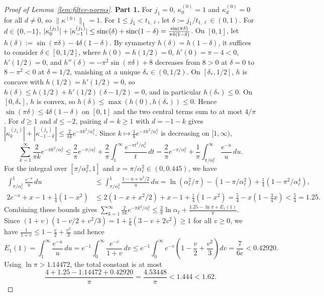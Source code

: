 \begin{proof}[Proof of Lemma~\ref{lem:filter-norms}]
\textbf{Part 1.} For $j_1 = 0$, $\kappa^{(0)}_0 = 1$ and $\kappa^{(0)}_d = 0$ for all $d \ne 0$, so $\|\kappa^{(0)}\|_1 = 1$. For $1 \le j_1 < t_{1,\ell}$, let $\delta := j_1 / t_{1,\ell} \in (0, 1)$. For $d \in \{0, -1\}$, $|\kappa^{(j_1)}_0| + |\kappa^{(j_1)}_{-1}| \le \operatorname{sinc}(\delta) + \operatorname{sinc}(1 - \delta) = \frac{\sin(\pi\delta)}{\pi\delta(1-\delta)}$. On $[0, 1]$, let $h(\delta) := \sin(\pi\delta) - 4\delta(1-\delta)$. By symmetry $h(\delta) = h(1-\delta)$, it suffices to consider $\delta \in [0, 1/2]$, where $h(0) = h(1/2) = 0$, $h'(0) = \pi - 4 < 0$, $h'(1/2) = 0$, and $h''(\delta) = -\pi^2\sin(\pi\delta) + 8$ decreases from $8 > 0$ at $\delta = 0$ to $8 - \pi^2 < 0$ at $\delta = 1/2$, vanishing at a unique $\delta_* \in (0, 1/2)$. On $[\delta_*, 1/2]$, $h$ is concave with $h(1/2) = h'(1/2) = 0$, so $h(\delta) \le h(1/2) + h'(1/2)(\delta - 1/2) = 0$, and in particular $h(\delta_*) \le 0$. On $[0, \delta_*]$, $h$ is convex, so $h(\delta) \le \max(h(0), h(\delta_*)) \le 0$. Hence $\sin(\pi\delta) \le 4\delta(1-\delta)$ on $[0, 1]$ and the two central terms sum to at most $4/\pi$. For $d \ge 1$ and $d \le -2$, pairing $d = k \ge 1$ with $d = -1-k$ gives $|\kappa^{(j_1)}_k| + |\kappa^{(j_1)}_{-1-k}| \le \frac{2}{\pi k} e^{-\pi k^2 / \alpha_\ell^2}$. Since $k \mapsto \frac{1}{k} e^{-\pi k^2 / \alpha_\ell^2}$ is decreasing on $[1, \infty)$,
\[
  \sum_{k=1}^\infty \frac{2}{\pi k} e^{-\pi k^2 / \alpha_\ell^2} \le \frac{2}{\pi} e^{-\pi/\alpha_\ell^2} + \frac{2}{\pi} \int_1^\infty \frac{e^{-\pi t^2 / \alpha_\ell^2}}{t}\,dt = \frac{2}{\pi} e^{-\pi/\alpha_\ell^2} + \frac{1}{\pi} \int_{\pi/\alpha_\ell^2}^\infty \frac{e^{-u}}{u}\,du.
\]
For the integral over $[\pi/\alpha_\ell^2, 1]$ and $x = \pi/\alpha_\ell^2 \in (0, 0.445)$, we have
\begin{align*}
  \int_{\pi/\alpha_\ell^2}^1 \frac{e^{-u}}{u}\,du &\le \int_{\pi/\alpha_\ell^2}^1 \frac{1 - u + u^2/2}{u}\,du = \ln(\alpha_\ell^2/\pi) - (1 - \pi/\alpha_\ell^2) + \frac{1}{4}(1 - \pi^2/\alpha_\ell^4), \\
  2e^{-x} + x - 1 + \frac{1}{4}(1 - x^2) &\le 2(1 - x + x^2/2) + x - 1 + \frac{1}{4}(1 - x^2) = \frac{5}{4} - x\left(1 - \frac{3}{4}x\right) < \frac{5}{4} = 1.25.
\end{align*}
Combining these bounds gives $\sum_{k=1}^\infty \frac{2}{\pi k} e^{-\pi k^2 / \alpha_\ell^2} \le \frac{2}{\pi}\ln\alpha_\ell + \frac{1.25 - \ln\pi + E_1(1)}{\pi}$. Since $(1+v)(1 - v/2 + v^2/3) = 1 + \frac{v}{6}(3 - v + 2v^2) \ge 1$ for all $v \ge 0$, we have $\frac{1}{1+v} \le 1 - \frac{v}{2} + \frac{v^2}{3}$ and hence
\[
  E_1(1) = \int_1^\infty \frac{e^{-u}}{u}\,du = e^{-1} \int_0^\infty \frac{e^{-v}}{1 + v}\,dv \le e^{-1} \int_0^\infty e^{-v}\!\left(1 - \frac{v}{2} + \frac{v^2}{3}\right)dv = \frac{7}{6 e} < 0.42920.
\]
Using $\ln\pi > 1.14472$, the total constant is at most
\[
  \frac{4 + 1.25 - 1.14472 + 0.42920}{\pi} = \frac{4.53448}{\pi} < 1.444 < 1.62.
\]


\end{proof}

